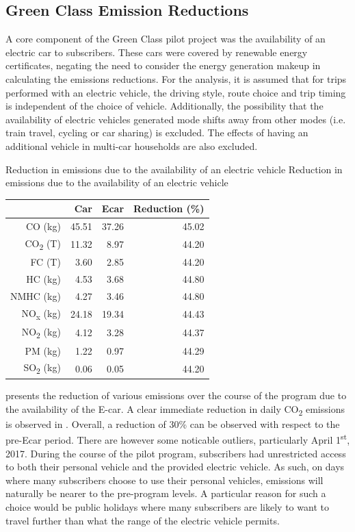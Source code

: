 \subsection{Green Class Emission Reductions}
A core component of the Green Class pilot project was the availability of an electric car to subscribers. These cars were covered by renewable energy certificates, negating the need to consider the energy generation makeup in calculating the emissions reductions. For the analysis, it is assumed that for trips performed with an electric vehicle, the driving style, route choice and trip timing is independent of the choice of vehicle. Additionally, the possibility that the availability of electric vehicles generated mode shifts away from other modes (i.e. train travel, cycling or car sharing) is excluded. 
The effects of having an additional vehicle in multi-car households are also excluded. 

\createtable%
{Reduction in emissions due to the availability of an electric vehicle}%
{Reduction in emissions due to the availability of an electric vehicle}%
{\label{tab:reduction_summary}}%
{%
\begin{tabular}{rrrr}
  \hline
 & Car & Ecar & Reduction (\%) \\ 
  \hline
CO (kg) & 45.51 & 37.26 & 45.02 \\ 
  CO\textsubscript{2} (T) & 11.32 & 8.97 & 44.20 \\ 
  FC (T) & 3.60 & 2.85 & 44.20 \\ 
  HC (kg) & 4.53 & 3.68 & 44.80 \\ 
  NMHC (kg) & 4.27 & 3.46 & 44.80 \\ 
  NO\textsubscript{x} (kg) & 24.18 & 19.34 & 44.43 \\ 
  NO\textsubscript{2} (kg) & 4.12 & 3.28 & 44.37 \\ 
  PM (kg) & 1.22 & 0.97 & 44.29 \\ 
  SO\textsubscript{2} (kg) & 0.06 & 0.05 & 44.20 \\ 
   \hline
\end{tabular}
}%
{}

 presents the reduction of various emissions over the course of the program due to the availability of the E-car. 
A clear immediate reduction in daily CO\textsubscript{2} emissions is observed in . 
Overall, a reduction of 30\% can be observed with respect to the pre-Ecar period. 
There are however some noticable outliers, particularly April 1\textsuperscript{st}, 2017. 
During the course of the pilot program, subscribers had unrestricted access to both their personal vehicle and the provided electric vehicle. 
As such, on days where many subscribers choose to use their personal vehicles, emissions will naturally be nearer to the pre-program levels. 
A particular reason for such a choice would be public holidays where many subscribers are likely to want to travel further than what the range of the electric vehicle permits.

